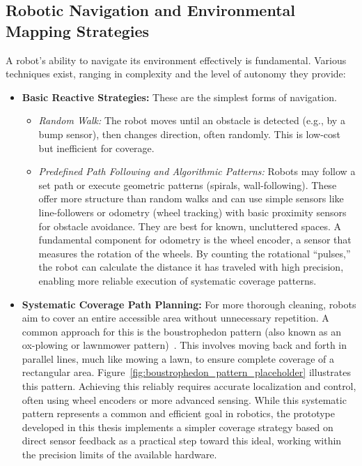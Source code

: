 \subsection*{Robotic Navigation and Environmental Mapping Strategies}
A robot's ability to navigate its environment effectively is fundamental. Various techniques exist, ranging in complexity and the level of autonomy they provide:
\begin{itemize}
    \item \textbf{Basic Reactive Strategies:} These are the simplest forms of navigation.
        \begin{itemize}
            \item \textit{Random Walk:} The robot moves until an obstacle is detected (e.g., by a bump sensor), then changes direction, often randomly. This is low-cost but inefficient for coverage.
            \item \textit{Predefined Path Following and Algorithmic Patterns:} Robots may follow a set path or execute geometric patterns (spirals, wall-following). These offer more structure than random walks and can use simple sensors like line-followers or odometry (wheel tracking) with basic proximity sensors for obstacle avoidance. They are best for known, uncluttered spaces. A fundamental component for odometry is the wheel encoder, a sensor that measures the rotation of the wheels. By counting the rotational ``pulses,'' the robot can calculate the distance it has traveled with high precision, enabling more reliable execution of systematic coverage patterns.
        \end{itemize}
    \item \textbf{Systematic Coverage Path Planning:} For more thorough cleaning, robots aim to cover an entire accessible area without unnecessary repetition. A common approach for this is the boustrophedon pattern (also known as an ox-plowing or lawnmower pattern)~\cite{Choset2001Coverage}. This involves moving back and forth in parallel lines, much like mowing a lawn, to ensure complete coverage of a rectangular area. Figure~\ref{fig:boustrophedon_pattern_placeholder} illustrates this pattern. Achieving this reliably requires accurate localization and control, often using wheel encoders or more advanced sensing. While this systematic pattern represents a common and efficient goal in robotics, the prototype developed in this thesis implements a simpler coverage strategy based on direct sensor feedback as a practical step toward this ideal, working within the precision limits of the available hardware.

\end{itemize}
